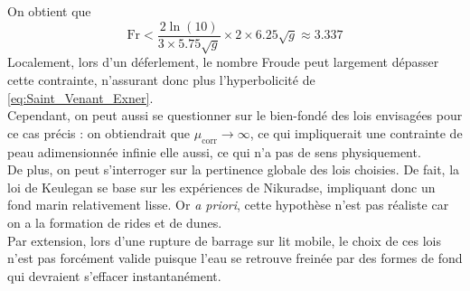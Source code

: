 \documentclass[11pt, a4paper, oneside]{report}
\begin{document}
On obtient que
\begin{equation}
    \text{Fr} < \frac{2 \ln(10)}{3 \times 5.75 \sqrt{g}} \times 2 \times 6.25 \sqrt{g} \approx 3.337
\end{equation}
Localement, lors d'un déferlement, le nombre Froude peut largement dépasser cette contrainte, n'assurant donc plus l'hyperbolicité de \eqref{eq:Saint_Venant_Exner}. \\
Cependant, on peut aussi se questionner sur le bien-fondé des lois envisagées pour ce cas précis : on obtiendrait que $\mu_\text{corr} \rightarrow \infty$, ce qui impliquerait une contrainte de peau adimensionnée infinie elle aussi, ce qui n'a pas de sens physiquement. \\
De plus, on peut s'interroger sur la pertinence globale des lois choisies. De fait, la loi de Keulegan se base sur les expériences de Nikuradse, impliquant donc un fond marin relativement lisse. Or \textit{a priori}, cette hypothèse n'est pas réaliste car on a la formation de rides et de dunes. \\
Par extension, lors d'une rupture de barrage sur lit mobile, le choix de ces lois n'est pas forcément valide puisque l'eau se retrouve freinée par des formes de fond qui devraient s'effacer instantanément. \\
\end{document}
